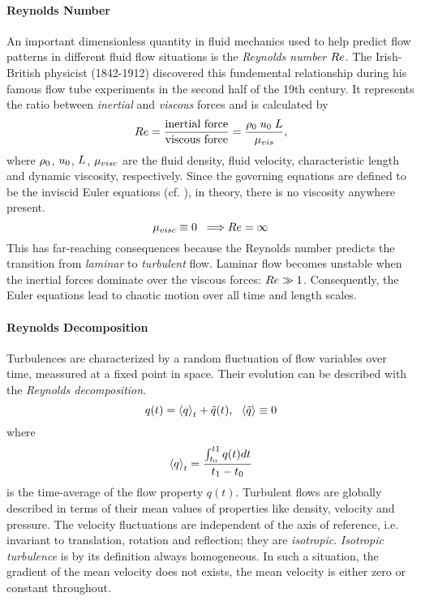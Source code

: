 \paragraph{Reynolds Number}
An important dimensionless quantity in fluid mechanics used to help predict
flow patterns in different fluid flow situations is the \emph{Reynolds number}
$Re$. The Irish-British physicist  (1842-1912)
discovered this fundemental relationship during his famous flow tube
experiments in the second half of the 19th century. It represents the ratio
between \emph{inertial} and \emph{viscous} forces and is calculated by
\begin{equation}
\label{eqn:reynold}
    Re = \frac{\text{inertial force}}{\text{viscous force}} = \frac{\rho_0\;u_0\;L}{\mu_{vis}},
\end{equation}
where $\rho_0$, $u_0$, $L$, $\mu_{visc}$ are the fluid density,
fluid velocity, characteristic length and dynamic viscosity, respectively.
Since the governing equations are defined to be the inviscid Euler equations
(cf. ), in theory, there is no viscosity anywhere present.
\begin{equation}
\label{eqn:no-viscosity}
    \mu_{visc} \equiv 0 \;\; \Longrightarrow Re = \infty
\end{equation}
This has far-reaching consequences because the Reynolds number predicts the
transition from \emph{laminar} to \emph{turbulent} flow. Laminar flow becomes
unstable when the inertial forces dominate over the viscous forces: $Re
\gg 1$. Consequently, the Euler equations lead to chaotic motion over all time and
length scales.

\paragraph{Reynolds Decomposition}
Turbulences are characterized by a random fluctuation of flow variables over time,
meassured at a fixed point in space. Their evolution can be described
with the \emph{Reynolds decomposition}.
\begin{equation}
    q(t) = \avg{q}_t + \tilde{q}(t), \ \ \avg{\tilde{q}} \equiv 0
\end{equation}
where 
\begin{equation}
    \left\langle q\right\rangle_t = \frac{\int_{t_0}^{t1} q(t) dt}{t_1 - t_0}
\end{equation}
is the time-average of the flow property $q(t)$.  Turbulent flows are globally
described in terms of their mean values of properties like density, velocity
and pressure. The velocity fluctuations are independent of the axis of
reference, i.e. invariant to translation, rotation and reflection; they are
\emph{isotropic}. \emph{Isotropic turbulence} is by its definition always
homogeneous. In such a situation, the gradient of the mean velocity does not
exists, the mean velocity is either zero or constant throughout.

